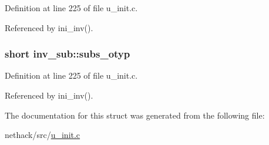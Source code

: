 Definition at line 225 of file u\+\_\+init.\+c.



Referenced by ini\+\_\+inv().

\hypertarget{structinv__sub_a880826fb766b8e8f95b019b96c52ddfc}{
\subsubsection[{subs\+\_\+otyp}]{\setlength{\rightskip}{0pt plus 5cm}short inv\+\_\+sub\+::subs\+\_\+otyp}}\label{structinv__sub_a880826fb766b8e8f95b019b96c52ddfc}


Definition at line 225 of file u\+\_\+init.\+c.



Referenced by ini\+\_\+inv().



The documentation for this struct was generated from the following file\+:\begin{DoxyCompactItemize}
\item 
nethack/src/\hyperlink{u__init_8c}{u\+\_\+init.\+c}\end{DoxyCompactItemize}
